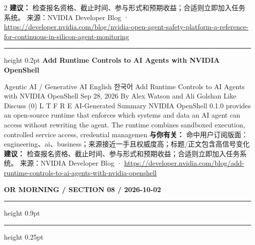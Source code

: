 \documentclass[10.5pt]{ctexart}
\begin{document}
\begin{multicols}{2}
\textbf{建议：} 检查报名资格、截止时间、参与形式和预期收益；合适则立即加入任务系统。
{\footnotesize\color{ormuted} 来源：NVIDIA Developer Blog · \url{https://developer.nvidia.com/blog/nvidia-open-agent-safety-platform-a-reference-for-continuous-in-silicon-agent-monitoring}}
\vspace{2mm}
\hrule height 0.2pt
\vspace{2mm}
{\large\bfseries Add Runtime Controls to AI Agents with NVIDIA OpenShell}\par
Agentic AI / Generative AI English 한국어 Add Runtime Controls to AI Agents with NVIDIA OpenShell Sep 28, 2026 By Alex Watson and Ali Golshan Like Discuss (0) L T F R E AI-Generated Summary NVIDIA OpenShell 0.1.0 provides an open-source runtime that enforces which systems and data an AI agent can access without rewriting the agent. The runtime combines sandboxed execution, controlled service access, credential managemen
\textbf{与你有关：} 命中用户订阅版面：engineering、ai、business；来源接近一手且权威度高；标题/正文包含高信号变化
\textbf{建议：} 检查报名资格、截止时间、参与形式和预期收益；合适则立即加入任务系统。
{\footnotesize\color{ormuted} 来源：NVIDIA Developer Blog · \url{https://developer.nvidia.com/blog/add-runtime-controls-to-ai-agents-with-nvidia-openshell}}
\end{multicols}
\newpage
{\small\bfseries OR MORNING / SECTION 08 / 2026-10-02}
\vspace{2mm}
\hrule height 0.9pt
\vspace{1.5mm}
\hrule height 0.25pt
\vspace{4mm}
\end{document}
